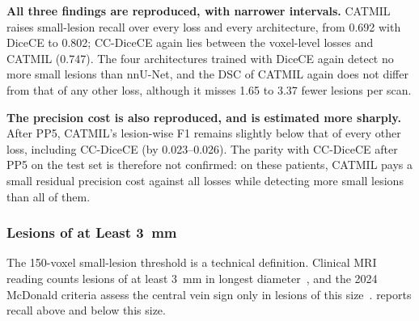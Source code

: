 \textbf{All three findings are reproduced, with narrower intervals.}
CATMIL raises small-lesion recall over every loss and every architecture,
from 0.692 with DiceCE to 0.802; CC-DiceCE again lies between the
voxel-level losses and CATMIL (0.747). The four architectures trained with
DiceCE again detect no more small lesions than nnU-Net, and the DSC of
CATMIL again does not differ from that of any other loss, although it
misses 1.65 to 3.37 fewer lesions per scan.

\textbf{The precision cost is also reproduced, and is estimated more
sharply.} After PP5, CATMIL's lesion-wise F1 remains slightly below that of
every other loss, including CC-DiceCE (by 0.023--0.026). The parity with
CC-DiceCE after PP5 on the test set is therefore not confirmed: on these
patients, CATMIL pays a small residual precision cost against all losses
while detecting more small lesions than all of them.

\subsubsection{Lesions of at Least 3~mm}
\label{sec:clinical_size}

The 150-voxel small-lesion threshold is a technical definition. Clinical
MRI reading counts lesions of at least 3~mm in longest
diameter~\cite{barkhof_2024_2025,filippi_mri_2016}, and the 2024 McDonald
criteria assess the central vein sign only in lesions of this
size~\cite{montalban_diagnosis_2025,barkhof_2024_2025}.
 reports recall above and below this size.

